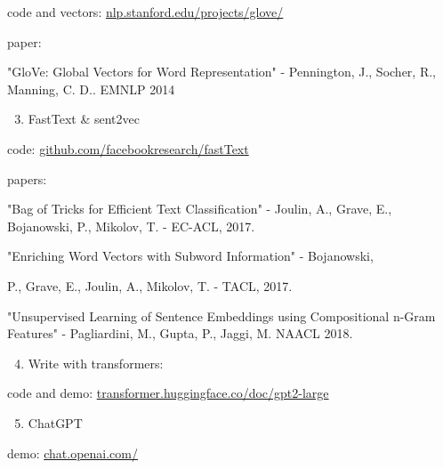 \documentclass[10pt]{article}
\begin{document}
code and vectors: \href{http://nlp.stanford.edu/projects/glove/}{nlp.stanford.edu/projects/glove/}

paper:

"GloVe: Global Vectors for Word Representation" - Pennington, J., Socher, R., Manning, C. D.. EMNLP 2014

\begin{enumerate}
  \setcounter{enumi}{2}
  \item FastText \& sent2vec
\end{enumerate}

code: \href{http://github.com/facebookresearch/fastText}{github.com/facebookresearch/fastText}

papers:

"Bag of Tricks for Efficient Text Classification" - Joulin, A., Grave, E., Bojanowski, P., Mikolov, T. - EC-ACL, 2017.

"Enriching Word Vectors with Subword Information" - Bojanowski,

P., Grave, E., Joulin, A., Mikolov, T. - TACL, 2017.

"Unsupervised Learning of Sentence Embeddings using Compositional n-Gram Features" - Pagliardini, M., Gupta, P., Jaggi, M. NAACL 2018.

\begin{enumerate}
  \setcounter{enumi}{3}
  \item Write with transformers:
\end{enumerate}

code and demo: \href{http://transformer.huggingface.co/doc/gpt2-large}{transformer.huggingface.co/doc/gpt2-large}

\begin{enumerate}
  \setcounter{enumi}{4}
  \item ChatGPT
\end{enumerate}

demo: \href{http://chat.openai.com/}{chat.openai.com/}
\end{document}
